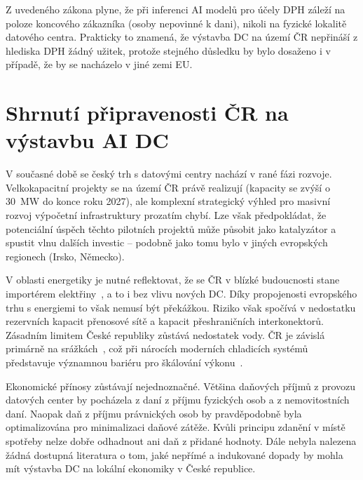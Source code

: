  Z uvedeného zákona plyne, že při inferenci AI modelů pro účely DPH záleží na poloze koncového zákazníka (osoby nepovinné k dani), nikoli na fyzické lokalitě datového centra. Prakticky to znamená, že výstavba DC na území ČR nepřináší z hlediska DPH žádný užitek, protože stejného důsledku by bylo dosaženo i v případě, že by se nacházelo v jiné zemi EU.

\section{Shrnutí připravenosti ČR na výstavbu AI DC}
\label{sec:cz_syntéza}


V současné době se český trh s datovými centry nachází v rané fázi rozvoje. Velkokapacitní projekty se na území ČR právě realizují (kapacity se zvýší o 30~MW do konce roku 2027), ale komplexní strategický výhled pro masivní rozvoj výpočetní infrastruktury prozatím chybí. Lze však předpokládat, že potenciální úspěch těchto pilotních projektů může působit jako katalyzátor a spustit vlnu dalších investic -- podobně jako tomu bylo v jiných evropských regionech (Irsko, Německo).

V oblasti energetiky je nutné reflektovat, že se ČR v blízké budoucnosti stane importérem elektřiny~\cite{chlubna_vypnuti_2025}, a to i bez vlivu nových DC. Díky propojenosti evropského trhu s energiemi to však nemusí být překážkou. Riziko však spočívá v nedostatku rezervních kapacit přenosové sítě a kapacit přeshraničních interkonektorů. Zásadním limitem České republiky zůstává nedostatek vody. ČR je závislá primárně na srážkách~\cite{hornicek_water_2026}, což při nárocích moderních chladicích systémů představuje významnou bariéru pro škálování výkonu~\cite{li_making_2025}.

Ekonomické přínosy zůstávají nejednoznačné. Většina daňových příjmů z provozu datových center by pocházela z daní z příjmu fyzických osob a z nemovitostních daní. Naopak daň z příjmu právnických osob by pravděpodobně byla optimalizována pro minimalizaci daňové zátěže. Kvůli principu zdanění v místě spotřeby nelze dobře odhadnout ani daň z přidané hodnoty. Dále nebyla nalezena žádná dostupná literatura o tom, jaké nepřímé a indukované dopady by mohla mít výstavba DC na lokální ekonomiky v České republice.

